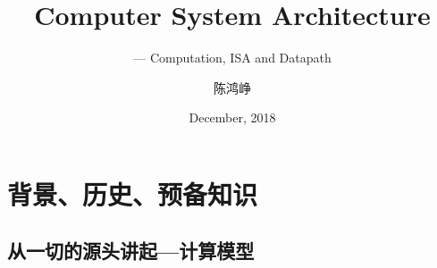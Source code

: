 \documentclass[UTF8]{ctexbeamer}
\title{Computer System Architecture}
\subtitle{--- Computation, ISA and Datapath}
\author[chhzh123]{陈鸿峥}
\date[Dec 30, 2018]{December, 2018}
\begin{document}
\begin{frame}
\titlepage
\end{frame}

\begin{frame}
\tableofcontents[hideallsubsections]
\end{frame}

\section{背景、历史、预备知识}
\begin{frame}
\sectionpage
\end{frame}

\subsection{从一切的源头讲起---计算模型}
\begin{frame}
\subsectionpage
\end{frame}
\end{document}
